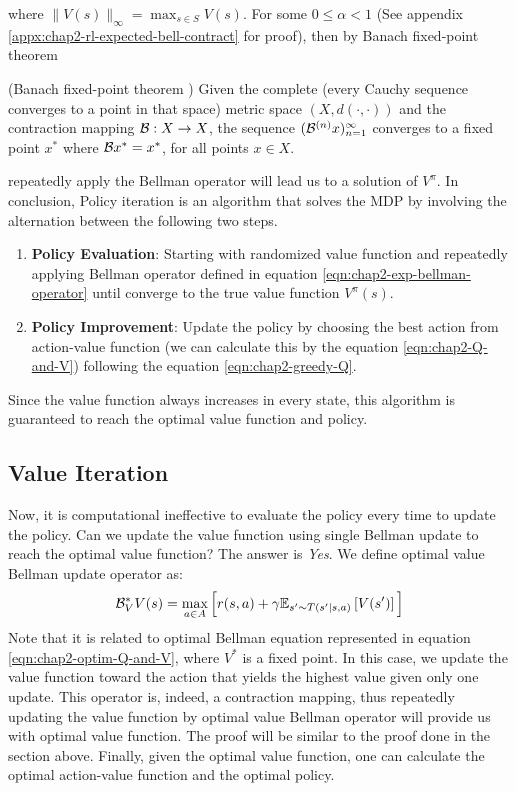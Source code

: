 where $\|V(s)\|_\infty = \max_{s \in S} V(s)$. For some $0 \le \alpha < 1$ (See appendix \ref{appx:chap2-rl-expected-bell-contract} for proof), then by Banach fixed-point theorem
\begin{theorem}{(Banach fixed-point theorem \cite{murfet_2019})}
    Given the complete (every Cauchy sequence converges to a point in that space) metric space $(X, d(\cdot, \cdot))$ and the contraction mapping $\mathcal{B} : X \rightarrow X$, the sequence $(\mathcal{B}^{(n)} x)^{\infty}_{n=1}$ converges to a fixed point $x^*$ where $\mathcal{B} x^* = x^*$, for all points $x \in X$. 
\end{theorem}
repeatedly apply the Bellman operator will lead us to a solution of $V^{\pi}$.  In conclusion, Policy iteration is an algorithm that solves the MDP by involving the alternation between the following two steps.
\begin{enumerate}
    \item \textbf{Policy Evaluation}: Starting with randomized value function and repeatedly applying Bellman operator defined in equation \ref{eqn:chap2-exp-bellman-operator} until converge to the true value function $V^{\pi}(s)$.
    \item \textbf{Policy Improvement}: Update the policy by choosing the best action from action-value function (we can calculate this by the equation \ref{eqn:chap2-Q-and-V}) following the equation \ref{eqn:chap2-greedy-Q}.
\end{enumerate}
Since the value function always increases in every state, this algorithm is guaranteed to reach the optimal value function and policy. 

\subsection{Value Iteration}
\label{sec:chap2-value-iter}
Now, it is computational ineffective to evaluate the policy every time to update the policy. Can we update the value function using single Bellman update to reach the optimal value function? The answer is \textit{Yes}. We define optimal value Bellman update operator as:
\begin{equation}
    \label{eqn:chap2-optimal-bellman-operator}
    \mathcal{B}^*_V V(s) = \max_{a \in A}\Big[r(s, a) + \gamma \mathbb{E}_{s' \sim T(s' | s, a)}\left[ V(s') \right] \Big]
\end{equation}
Note that it is related to optimal Bellman equation represented in equation \ref{eqn:chap2-optim-Q-and-V}, where $V^*$ is a fixed point. In this case, we update the value function toward the action that yields the highest value given only one update. This operator is, indeed, a contraction mapping, thus repeatedly updating the value function by optimal value Bellman operator will provide us with optimal value function. The proof will be similar to the proof done in the section above. Finally, given the optimal value function, one can calculate the optimal action-value function and the optimal policy. 

